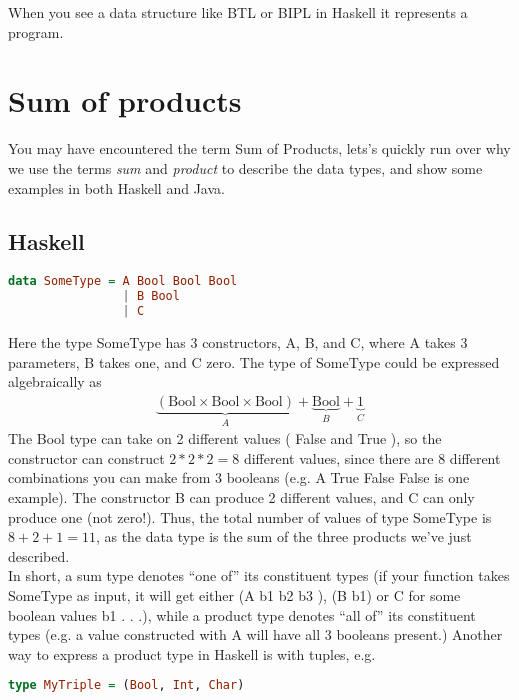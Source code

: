     When you see a data structure like \gls{BTL} or \gls{BIPL} in Haskell it represents a program.
    

    \newpage
    \section{Sum of products}
        You may have encountered the term \gls{Sum of Products}, lets's quickly run over why we use the terms \textit{sum} and \textit{product} 
        to describe the data types, and show some examples in both Haskell and Java.

        \subsection*{Haskell}
            \begin{lstlisting}[language=Haskell]
data SomeType = A Bool Bool Bool
                | B Bool
                | C
            \end{lstlisting}
            Here the type SomeType has 3 constructors, A, B, and C, where A takes 3 parameters, B takes one, and C zero. 
            The type of SomeType could be expressed algebraically as
            \begin{align*}
                \underbrace{(\text{Bool} \times \text{Bool} \times \text{Bool})}_{A} + \underbrace{\text{Bool}}_{B} + \underbrace{1}_{C}
            \end{align*}
            The Bool type can take on 2 different values
            ( False and True ), so the constructor
            can construct $2 * 2 * 2 = 8$ different values, since there are 8 different combinations you can
            make from 3 booleans (e.g. A True False False is one example). The constructor B can
            produce 2 different values, and C can only produce one (not zero!).
            Thus, the total number of values of type SomeType is $8 + 2 + 1 = 11$, as the data type
            is the sum of the three products we've just described.\\
            In short, a sum type denotes “one of” its constituent types (if your function takes SomeType
            as input, it will get either (A b1 b2 b3 ), (B b1) or C for some boolean values b1 . . .), while
            a product type denotes “all of” its constituent types (e.g. a value constructed with A will
            have all 3 booleans present.) Another way to express a product type in Haskell is with tuples,
            e.g.
            \begin{lstlisting}[language=Haskell]
type MyTriple = (Bool, Int, Char)
            \end{lstlisting}


